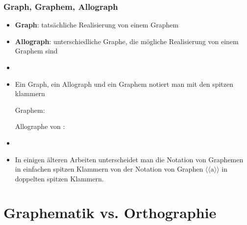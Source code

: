 \begin{frame}
\frametitle{Graph, Graphem, Allograph}

	\begin{itemize}
		\item \textbf{Graph}: tatsächliche Realisierung von einem Graphem
		\item \textbf{Allograph}: unterschiedliche Graphe, die mögliche Realisierung von einem Graphem sind
		\item[]
		\item Ein Graph, ein Allograph und ein Graphem notiert man mit den spitzen klammern \ab{}
	
			Graphem: 

			Allographe von :     %

		\item[]
		\item In einigen älteren Arbeiten unterscheidet man die Notation von Graphemen  in einfachen spitzen Klammern von der Notation von Graphen $\langle \langle$a$\rangle \rangle$ in doppelten spitzen Klammern.
	\end{itemize}


\end{frame}


\section{Graphematik vs. Orthographie}



